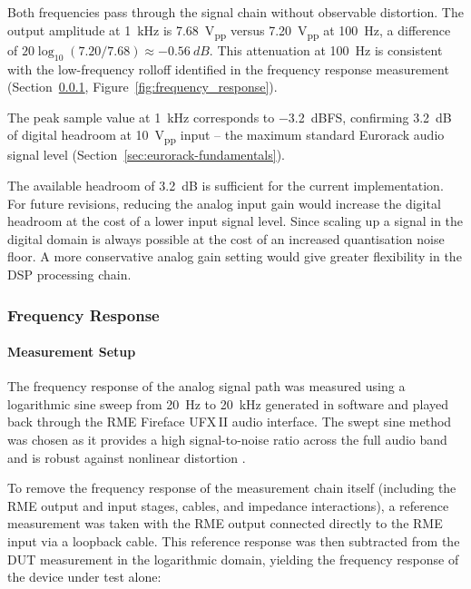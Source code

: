 Both frequencies pass through the signal chain without observable distortion.
The output amplitude at \qty{1}{kHz} is \qty{7.68}{V_{pp}} versus \qty{7.20}{V_{pp}} at \qty{100}{Hz}, a difference of $20 \log_{10}(7.20 / 7.68) \approx \qty{-0.56}{dB}$.
This attenuation at \qty{100}{Hz} is consistent with the low-frequency rolloff identified in the frequency response measurement (Section~\ref{sec:frequency-response}, Figure~\ref{fig:frequency_response}).

The peak sample value at \qty{1}{kHz} corresponds to \qty{-3.2}{dBFS}, confirming \qty{3.2}{dB} of digital headroom at \SI{10}{V_{pp}} input -- the maximum standard Eurorack audio signal level (Section~\ref{sec:eurorack-fundamentals}).

The available headroom of \qty{3.2}{dB} is sufficient for the current implementation.
For future revisions, reducing the analog input gain would increase the digital headroom at the cost of a lower input signal level.
Since scaling up a signal in the digital domain is always possible at the cost of an increased quantisation noise floor. 
A more conservative analog gain setting would give greater flexibility in the DSP processing chain.

\subsubsection{Frequency Response}
\label{sec:frequency-response}

\paragraph{Measurement Setup}

The frequency response of the analog signal path was measured using a logarithmic sine sweep from \qty{20}{Hz} to \qty{20}{kHz} generated in software and played back through the RME Fireface UFX\,II audio interface. 
The swept sine method was chosen as it provides a high signal-to-noise ratio across the full audio band and is robust against nonlinear distortion \cite[p.20]{massaraniTransferFunctionMeasurementSweeps2001}.

To remove the frequency response of the measurement chain itself (including the RME output and input stages, cables, and impedance interactions), a reference measurement was taken with the RME output connected directly to the RME input via a loopback cable. 
This reference response was then subtracted from the DUT measurement in the logarithmic domain, yielding the frequency response of the device under test alone:


